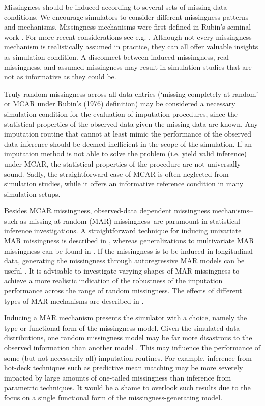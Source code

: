 \documentclass[bimj,fleqn]{w-art}
\begin{document}
Missingness should be induced according to several sets of missing data conditions. We encourage simulators to consider different missingness patterns and mechanisms. Missingness mechanisms were first defined in Rubin's seminal work \citep{rubi76}. For more recent considerations see e.g. \citet{seam13, meal15, dore18, more18, scho18, litt20, moha21, scho21}. Although not every missingness mechanism is realistically assumed in practice, they can all offer valuable insights as simulation condition. A disconnect between induced missingness, real missingness, and assumed missingness may result in simulation studies that are not as informative as they could be.

Truly random missingness across all data entries (`missing completely at random' or MCAR under Rubin's (1976) \nocite{rubi76} definition) may be considered a necessary simulation condition for the evaluation of imputation procedures, since the statistical properties of the observed data given the missing data are known. Any imputation routine that cannot at least mimic the performance of the observed data inference should be deemed inefficient in the scope of the simulation. If an imputation method is not able to solve the problem (i.e. yield valid inference) under MCAR, the statistical properties of the procedure are not universally sound. Sadly, the straightforward case of MCAR is often neglected from simulation studies, while it offers an informative reference condition in many simulation setups.

Besides MCAR missingness, observed-data dependent missingness mechanisms--such as missing at random (MAR) missingness--are paramount in statistical inference investigations. A straightforward technique for inducing univariate MAR missingness is described in \citet[][\S 3.2.4]{buur18}, whereas generalizations to multivariate MAR missingness can be found in \citet{ampute}. If the missingness is to be induced in longitudinal data, generating the missingness through autoregressive MAR models can be useful \citep[see e.g.][model 2 and model 3]{shara2015randomly}. It is advisable to investigate varying shapes of MAR missingness to achieve a more realistic indication of the robustness of the imputation performance across the range of random missingness. The effects of different types of MAR mechanisms are described in \citet{scho18}. 

Inducing a MAR mechanism presents the simulator with a choice, namely the type or functional form of the missingness model. Given the simulated data distributions, one random missingness model may be far more disastrous to the observed information than another model \citep{scho18}. This may influence the performance of some (but not necessarily all) imputation routines. For example, inference from hot-deck techniques such as predictive mean matching \citep{little1988missing, rubin1986statistical} may be more severely impacted by large amounts of one-tailed missingness than inference from parametric techniques. It would be a shame to overlook such results due to the focus on a single functional form of the missingness-generating model.
\end{document}
